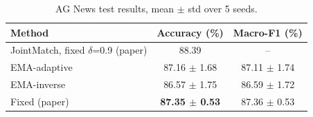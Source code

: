\begin{table}[t]
\centering
\begin{tabular}{lcc}
\toprule
Method & Accuracy (\%) & Macro-F1 (\%) \\
\midrule
JointMatch, fixed $\delta$=0.9 (paper) & 88.39 & -- \\
EMA-adaptive & 87.16 $\pm$ 1.68 & 87.11 $\pm$ 1.74 \\
EMA-inverse & 86.57 $\pm$ 1.75 & 86.59 $\pm$ 1.72 \\
Fixed (paper) & \textbf{87.35 $\pm$ 0.53} & 87.36 $\pm$ 0.53 \\
\bottomrule
\end{tabular}
\caption{AG News test results, mean $\pm$ std over 5 seeds.}
\label{tab:agnews-adaptive-delta}
\end{table}
